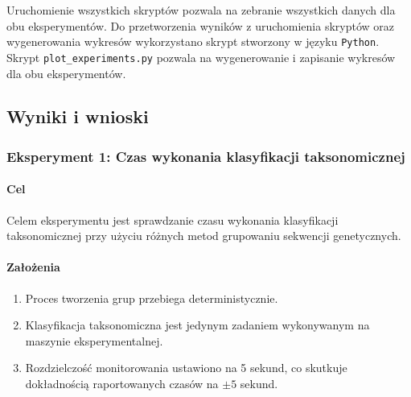             Uruchomienie wszystkich skryptów pozwala na zebranie wszystkich danych dla obu eksperymentów. Do przetworzenia wyników z uruchomienia skryptów oraz wygenerowania wykresów wykorzystano skrypt stworzony w języku \texttt{Python}. Skrypt \texttt{plot\_experiments.py} pozwala na wygenerowanie i zapisanie wykresów dla obu eksperymentów.

    \subsection{Wyniki i wnioski}

        \subsubsection{Eksperyment 1: Czas wykonania klasyfikacji taksonomicznej}

            \paragraph{Cel}
                Celem eksperymentu jest sprawdzanie czasu wykonania klasyfikacji taksonomicznej przy użyciu różnych metod grupowaniu sekwencji genetycznych.

            \paragraph{Założenia}
                \begin{enumerate}
                    \item {
                        Proces tworzenia grup przebiega deterministycznie.
                    }
                    \item {
                        Klasyfikacja taksonomiczna jest jedynym zadaniem wykonywanym na maszynie eksperymentalnej.
                    }
                    \item {
                        Rozdzielczość monitorowania ustawiono na 5 sekund, co skutkuje dokładnością raportowanych czasów na $\pm 5$ sekund.
                    }
                \end{enumerate}

